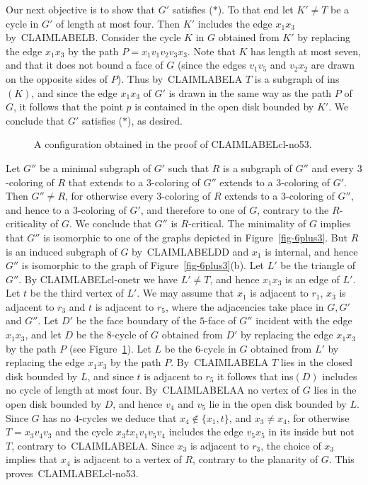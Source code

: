 \documentclass{article}
\def\refclaim#1{\csname CLAIMLABEL#1\endcsname}
\def\endclaim{\medskip}
\def\rt#1{#1}
\begin{document}
Our next objective is to show that $G'$ satisfies ($*$).
To that end let $K'\ne T$ be a cycle in $G'$ of length at most four.
Then $K'$ includes the edge $x_1x_3$ by~\refclaim{B}.
Consider the cycle $K$ in $G$ obtained from $K'$ by replacing the edge
$x_1x_3$ by the path $P=x_1v_1v_2v_3x_3$.
Note that $K$ has length at most seven, and that it does not bound a face 
\rt{of $G$}
(since the edges $v_1v_5$ and $v_2x_2$ are drawn on the opposite sides of $P$).
Thus by~\refclaim{A} $T$ is a subgraph of ins$(K)$, and since the edge $x_1x_3$ of $G'$
is drawn in the same way as the path $P$ of $G$, it follows that the point $p$
is contained in the open disk bounded by $K'$.
We conclude that $G'$ satisfies ($*$), as desired.

\begin{figure}
\begin{center}
\end{center}
\caption{A configuration obtained in the proof of \refclaim{cl-no53}.}
\label{fig-12}
\end{figure}

Let $G''$ be a minimal subgraph of $G'$ such that $R$ is a subgraph
of $G''$ and 
every $3$-coloring of $R$ that extends to a $3$-coloring of $G''$ extends
to a $3$-coloring of $G'$.  
Then $G''\ne R$, for otherwise every $3$-coloring of $R$ extends to
a $3$-coloring of $G''$, and hence to a $3$-coloring of $G'$, 
and therefore to one of $G$, contrary to the $R$-criticality of $G$.
We conclude that $G''$ is $R$-critical.
The minimality of $G$ implies that $G''$ is isomorphic to one of the
graphs depicted in Figure~\ref{fig-6plus3}.
But $R$ is an induced subgraph of $G$ by~\refclaim{DD} 
and $x_1$ is internal, and hence $G''$
is isomorphic to the graph of Figure~\ref{fig-6plus3}(b).
Let $L'$ be the triangle of $G''$. 
By \refclaim{cl-onetr} we have $L'\neq T$, 
and hence $x_1x_3$ is an edge of $L'$.
Let $t$ be the third vertex of $L'$.
We may assume that $x_1$ is adjacent to $r_1$, $x_3$ is adjacent to $r_3$
and $t$ is adjacent to $r_5$, where the adjacencies take place in
$G,G'$ and $G''$.
Let $D'$ be the face boundary of the $5$-face of $G''$ incident with the edge 
$x_1x_3$, and let $D$ be the $8$-cycle of $G$ obtained
from $D'$ by replacing the edge $x_1x_3$ by the path $P$ (see Figure~\ref{fig-12}).  
Let $L$ be the $6$-cycle in $G$ obtained from $L'$ by
replacing the edge $x_1x_3$ by the path $P$.  
By~\refclaim{A} $T$ lies in the closed disk bounded by $L$, and 
since $t$ is adjacent to $r_5$ it follows that
ins$(D)$ includes no cycle of length at most four.  
By~\refclaim{AA}
no vertex of $G$ lies in the open disk bounded by $D$, 
and hence $v_4$ and $v_5$ lie in the open disk bounded by $L$.
Since $G$ has no $4$-cycles we deduce that $x_4\not\in\{x_1,t\}$,
and $x_3\ne x_4$, for otherwise $T=x_3v_4v_3$ and the cycle
$x_3tx_1v_1v_5v_4$ includes the edge $v_5x_5$ in its inside but not $T$,
contrary to~\refclaim{A}.
Since $x_3$ is adjacent to $r_3$, the choice of $x_3$ implies that
$x_4$ is adjacent to a vertex of $R$, contrary to the planarity of $G$.
This proves~\refclaim{cl-no53}.
\endclaim
\end{document}
